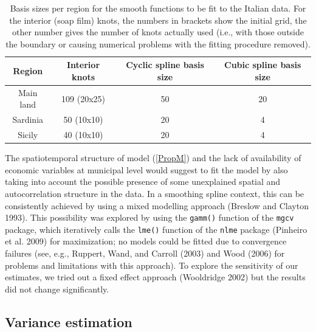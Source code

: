 \documentclass[10pt] {article}
\theoremstyle{definition}
\theoremstyle{plain}
\begin{document}
\begin{table}[htbp]
\centering
\begin{tabular}{c c c c}\\
\hline
\hline
Region & Interior knots & Cyclic spline basis size & Cubic spline basis size\\
\hline
Main land & 109 (20x25) & 50 & 20\\
Sardinia & 50 (10x10) & 20 & 4\\
Sicily & 40 (10x10) & 20 & 4\\
\hline
\hline
\end{tabular}
\caption{Basis sizes per region for the smooth functions to be fit to the Italian data. For the interior (soap film) knots, the numbers in brackets show the initial grid, the other number gives the number of knots actually used (i.e., with those outside the boundary or causing numerical problems with the fitting procedure removed).}
\label{soap-basis-table}
\end{table}

The spatiotemporal structure of model (\ref{PropM}) and the lack of availability of economic variables at municipal level would suggest to fit the model by also taking into account the possible presence of some unexplained spatial and autocorrelation structure in the data. In a smoothing spline context, this can be consistently achieved by using a mixed modelling approach (Breslow and Clayton 1993). This possibility was explored by using the \texttt{gamm()} function of the \texttt{mgcv} package, which iteratively calls the \texttt{lme()} function of the \texttt{nlme} package (Pinheiro et al. 2009) for maximization; no models could be fitted due to convergence failures (see, e.g., Ruppert, Wand, and Carroll (2003) and Wood (2006) for problems and limitations with this approach). To explore the sensitivity of our estimates, we tried out a fixed effect approach (Wooldridge 2002) but the results did not change significantly.

\subsection{Variance estimation \label{VE}}
\end{document}
